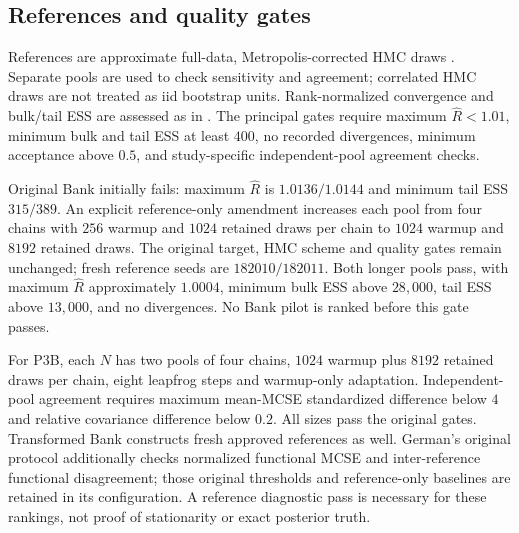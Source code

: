 \subsection{References and quality gates}\label{app:references}
References are approximate full-data, Metropolis-corrected HMC draws \citep{neal2012hmc}. Separate pools are used to check sensitivity and agreement; correlated HMC draws are not treated as iid bootstrap units. Rank-normalized convergence and bulk/tail ESS are assessed as in \citet{vehtari2021rank}. The principal gates require maximum $\widehat R<1.01$, minimum bulk and tail ESS at least $400$, no recorded divergences, minimum acceptance above $0.5$, and study-specific independent-pool agreement checks.

Original Bank initially fails: maximum $\widehat R$ is $1.0136/1.0144$ and minimum tail ESS $315/389$. An explicit reference-only amendment increases each pool from four chains with $256$ warmup and $1024$ retained draws per chain to $1024$ warmup and $8192$ retained draws. The original target, HMC scheme and quality gates remain unchanged; fresh reference seeds are $182010/182011$. Both longer pools pass, with maximum $\widehat R$ approximately $1.0004$, minimum bulk ESS above $28{,}000$, tail ESS above $13{,}000$, and no divergences. No Bank pilot is ranked before this gate passes.

For P3B, each $N$ has two pools of four chains, $1024$ warmup plus $8192$ retained draws per chain, eight leapfrog steps and warmup-only adaptation. Independent-pool agreement requires maximum mean-MCSE standardized difference below $4$ and relative covariance difference below $0.2$. All sizes pass the original gates. Transformed Bank constructs fresh approved references as well. German's original protocol additionally checks normalized functional MCSE and inter-reference functional disagreement; those original thresholds and reference-only baselines are retained in its configuration. A reference diagnostic pass is necessary for these rankings, not proof of stationarity or exact posterior truth.

